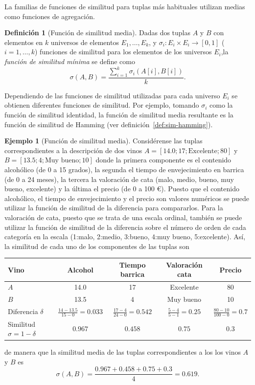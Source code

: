 \documentclass[a4paper,10pt,twoside]{article}
\theoremstyle{definition}
\newtheorem{definition}{Definición}
\newtheorem{example}{Ejemplo}
\begin{document}
La familias de funciones de similitud para tuplas más habituales utilizan medias como funciones de agregación. 

\begin{definition}[Función de similitud media]
Dadas dos tuplas $A$ y $B$ con elementos en $k$ universos de elementos $E_1,\ldots,E_k$, y \mbox{$\sigma_i: E_i\times E_i \longrightarrow [0,1]$} ($i=1,\ldots,k$) funciones de similitud para los elementos de los universos $E_i$,la \emph{función de similitud mínima} se define como
\[
\sigma(A,B)=\frac{\sum_{i=1}^{k}\sigma_i(A[i],B[i])}{k}.
\]
\end{definition}

Dependiendo de las funciones de similitud utilizadas para cada universo $E_i$ se obtienen diferentes funciones de similitud.
Por ejemplo, tomando $\sigma_i$ como la función de similitud identidad, la función de similitud media resultante es la función de similitud de Hamming (ver definición~\ref{def:sim-hamming}).

\begin{example}[Función de similitud media]
Considérense las tuplas correspondientes a la descripción de dos vinos $A=[14.0; 17; \mbox{Excelente}; 80]$ y $B=[13.5; 4; \mbox{Muy bueno}; 10]$ donde la primera componente es el contenido alcohólico (de 0 a 15 grados), la segunda el tiempo de envejecimiento en barrica (de 0 a 24 meses), la tercera la valoración de cata (malo, medio, bueno, muy bueno, excelente) y la última el precio (de 0 a 100 €).
Puesto que el contenido alcohólico, el tiempo de envejecimiento y el precio son valores numéricos se puede utilizar la función de
similitud de la diferencia para compararlos. 
Para la valoración de cata, puesto que se trata de una escala ordinal, también se puede utilizar la función de similitud de la
diferencia sobre el número de orden de cada categoría en la escala (1:malo, 2:medio, 3:bueno, 4:muy bueno, 5:excelente).
Así, la similitud de cada uno de los componentes de las tuplas son

\begin{center}
\begin{small}
\begin{tabular}{lcccc}
\toprule 
Vino & Alcohol & Tiempo barrica & Valoración cata & Precio\\
\midrule
$A$ & 14.0 & 17 & Excelente & 80\\
$B$ & 13.5 & 4 & Muy bueno & 10\\
\midrule
Diferencia $\delta$ & $\frac{14-13.5}{15-0}=0.033$ & $\frac{17-4}{24-0}=0.542$ & $\frac{5-4}{5-1}=0.25$ &
$\frac{80-10}{100-0}=0.7$\\
Similitud $\sigma=1-\delta$ & $0.967$ & $0.458$ & $0.75$ & $0.3$\\
\bottomrule
\end{tabular}
\end{small}
\end{center} 
de manera que la similitud media de las tuplas correspondientes a los los vinos $A$ y $B$ es 
\[
\sigma(A,B) = \frac{0.967+0.458+0.75+0.3}{4} = 0.619.
\]
\end{example}
\end{document}

